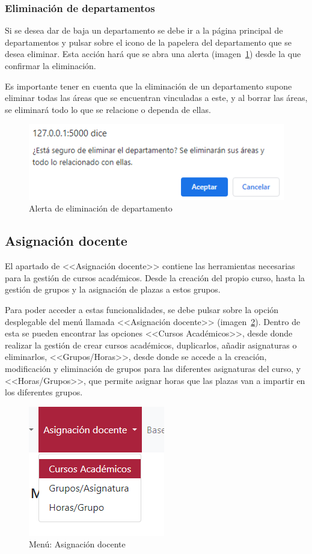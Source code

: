 \subsubsection{Eliminación de departamentos}
Si se desea dar de baja un departamento se debe ir a la página principal de departamentos y pulsar sobre el icono de la papelera del departamento que se desea eliminar.
Esta acción hará que se abra una alerta (imagen~\ref{pag:alertElDepartamento}) desde la que confirmar la eliminación.

Es importante tener en cuenta que la eliminación de un departamento supone eliminar todas las áreas que se encuentran vinculadas a este, y al borrar las áreas, se eliminará todo lo que se relacione o dependa de ellas.

\begin{figure}
	\centering
	\includegraphics[width=.6\textwidth]{../img/Anexos/Manual usuario/alertElDepartamento.png}
	\caption{Alerta de eliminación de departamento}\label{pag:alertElDepartamento}
\end{figure}

\subsection{Asignación docente}
El apartado de <<Asignación docente>> contiene las herramientas necesarias para la gestión de cursos académicos.
Desde la creación del propio curso, hasta la gestión de grupos y la asignación de plazas a estos grupos.

Para poder acceder a estas funcionalidades, se debe pulsar sobre la opción desplegable del menú llamada <<Asignación docente>> (imagen~\ref{pag:menuAsigDoc}).
Dentro de esta se pueden encontrar las opciones <<Cursos Académicos>>, desde donde realizar la gestión de crear cursos académicos, duplicarlos, añadir asignaturas o eliminarlos, <<Grupos/Horas>>, desde donde se accede a la creación, modificación y eliminación de grupos para las diferentes asignaturas del curso, y <<Horas/Grupos>>, que permite asignar horas que las plazas van a impartir en los diferentes grupos.

\begin{figure}
	\centering
	\includegraphics[width=.4\textwidth]{../img/Anexos/Manual usuario/menu asg doc.png}
	\caption{Menú: Asignación docente}\label{pag:menuAsigDoc}
\end{figure}

